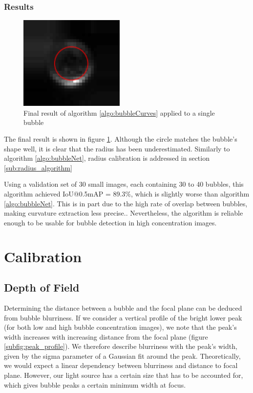 			\subsubsection{Results}

				\begin{figure}
					\centering
					\includegraphics[scale=1.3]{images/bubbleCurve_final_result.png}
					\caption{Final result of algorithm \ref{algo:bubbleCurves} applied to a single bubble}
					\label{fig:final_result}
				\end{figure}
				
				The final result is shown in figure \ref{fig:final_result}. Although the circle matches the bubble's shape well, it is clear that the radius has been underestimated. Similarly to algorithm \ref{algo:bubbleNet}, radius calibration is addressed in section \ref{sub:radius_algorithm}
				
				Using a validation set of 30 small images, each containing 30 to 40 bubbles, this algorithm achieved IoU@0.5mAP = 89.3\%, which is slightly worse than algorithm \ref{algo:bubbleNet}. This is in part due to the high rate of overlap between bubbles, making curvature extraction less precise.. Nevertheless, the algorithm is reliable enough to be usable for bubble detection in high concentration images.
				

	
	
	
	
	\section{Calibration}\label{calibration_algorithm}
		\subsection{Depth of Field}
			Determining the distance between a bubble and the focal plane can be deduced from bubble blurriness. If we consider a vertical profile of the bright lower peak (for both low and high bubble concentration images), we note that the peak's width increases with increasing distance from the focal plane (figure \ref{subfig:peak_profile}). We therefore describe blurriness with the peak's width, given by the sigma parameter of a Gaussian fit around the peak. Theoretically, we would expect a linear dependency between blurriness and distance to focal plane. However, our light source has a certain size that has to be accounted for, which gives bubble peaks a certain minimum width at focus. 
			
